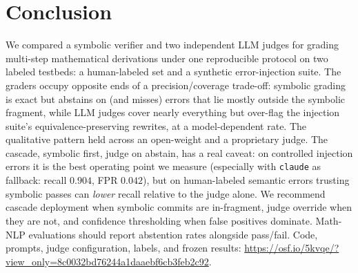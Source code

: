 \section{Conclusion}
\label{sec:conclusion}

We compared a symbolic verifier and two independent LLM judges for grading
multi-step mathematical derivations under one reproducible protocol on two
labeled testbeds: a human-labeled set and a synthetic error-injection suite.
The graders occupy opposite ends of a precision/coverage trade-off:
symbolic grading is exact but abstains on (and misses) errors that lie mostly
outside the symbolic fragment,
while LLM judges cover nearly everything but over-flag the injection suite's
equivalence-preserving rewrites, at a model-dependent rate. The qualitative pattern held across an
open-weight and a proprietary judge. The cascade, symbolic first, judge on
abstain, has a real caveat: on controlled injection errors it is the best
operating point we measure (especially with \texttt{claude} as fallback: recall $0.904$, FPR
$0.042$), but on human-labeled semantic errors trusting symbolic passes can
\emph{lower} recall relative to the judge alone. We recommend cascade deployment
when symbolic commits are in-fragment, judge override when they are not, and
confidence thresholding when false positives dominate. Math-NLP evaluations
should report abstention rates alongside pass/fail. Code, prompts, judge
configuration, labels, and frozen results:
\url{https://osf.io/5kvqe/?view_only=8c0032bd76244a1daaebf6cb3feb2c92}.
